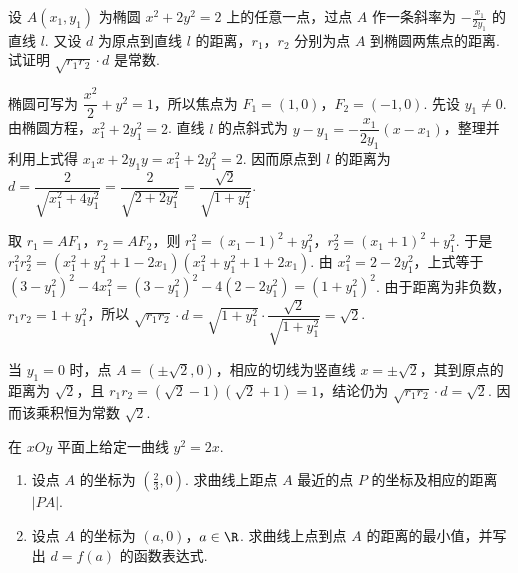 \begin{problem}
设 \(A(x_1,y_1)\) 为椭圆 \(x^2+2y^2=2\) 上的任意一点，过点 \(A\) 作一条斜率为 \(-\frac{x_1}{2y_1}\) 的直线 \(l\). 又设 \(d\) 为原点到直线 \(l\) 的距离，\(r_1\)，\(r_2\) 分别为点 \(A\) 到椭圆两焦点的距离. 试证明 \(\sqrt{r_1r_2}\cdot d\) 是常数.
\end{problem}

\begin{solution}
椭圆可写为 \(\dfrac{x^2}{2}+y^2=1\)，所以焦点为 \(F_1=(1,0)\)，\(F_2=(-1,0)\). 先设 \(y_1\neq0\). 由椭圆方程，\(x_1^2+2y_1^2=2\). 直线 \(l\) 的点斜式为 \(y-y_1=-\dfrac{x_1}{2y_1}(x-x_1)\)，整理并利用上式得
\(x_1x+2y_1y=x_1^2+2y_1^2=2\). 因而原点到 \(l\) 的距离为
\(d=\dfrac{2}{\sqrt{x_1^2+4y_1^2}}=\dfrac{2}{\sqrt{2+2y_1^2}}=\dfrac{\sqrt2}{\sqrt{1+y_1^2}}\).

取 \(r_1=AF_1\)，\(r_2=AF_2\)，则
\(r_1^2=(x_1-1)^2+y_1^2\)，\(r_2^2=(x_1+1)^2+y_1^2\). 于是
\(r_1^2r_2^2=\left(x_1^2+y_1^2+1-2x_1\right)\left(x_1^2+y_1^2+1+2x_1\right)\).
由 \(x_1^2=2-2y_1^2\)，上式等于
\(\left(3-y_1^2\right)^2-4x_1^2=\left(3-y_1^2\right)^2-4\left(2-2y_1^2\right)=\left(1+y_1^2\right)^2\).
由于距离为非负数，\(r_1r_2=1+y_1^2\)，所以
\(\sqrt{r_1r_2}\cdot d=\sqrt{1+y_1^2}\cdot\dfrac{\sqrt2}{\sqrt{1+y_1^2}}=\sqrt2\).

当 \(y_1=0\) 时，点 \(A=(\pm\sqrt2,0)\)，相应的切线为竖直线 \(x=\pm\sqrt2\)，其到原点的距离为 \(\sqrt2\)，且 \(r_1r_2=(\sqrt2-1)(\sqrt2+1)=1\)，结论仍为 \(\sqrt{r_1r_2}\cdot d=\sqrt2\). 因而该乘积恒为常数 \(\sqrt2\).
\end{solution}

\begin{problem}
在 \(xOy\) 平面上给定一曲线 \(y^2=2x\).

\begin{enumerate}
\item 设点 \(A\) 的坐标为 \(\left(\frac{2}{3},0\right)\). 求曲线上距点 \(A\) 最近的点 \(P\) 的坐标及相应的距离 \(|PA|\).
\item 设点 \(A\) 的坐标为 \((a,0)\)，\(a\in\R\). 求曲线上点到点 \(A\) 的距离的最小值，并写出 \(d=f(a)\) 的函数表达式.
\end{enumerate}
\end{problem}


